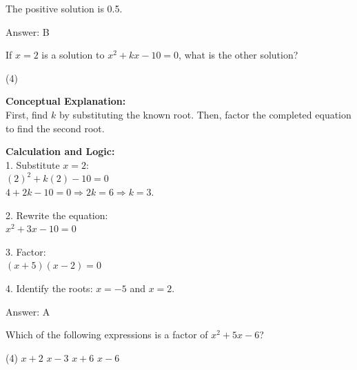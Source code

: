 \documentclass[11pt,paper=a4,answers]{exam}
\begin{document}
\begin{questions}
\begin{solution}
\vspace{10pt}

The positive solution is 0.5.

\vspace{20pt}

Answer: \colorbox{yellow!100}{B}
\end{solution}

\vspace{30pt}

\question
If $x = 2$ is a solution to $x^2 + kx - 10 = 0$, what is the other solution?
\begin{tasks}(4)
\end{tasks}

\begin{solution}
\textbf{Conceptual Explanation:} \\
First, find $k$ by substituting the known root. Then, factor the completed equation to find the second root.

\vspace{15pt}

\textbf{Calculation and Logic:} \\
1. Substitute $x = 2$: \\
   $(2)^2 + k(2) - 10 = 0$ \\
   $4 + 2k - 10 = 0 \Rightarrow 2k = 6 \Rightarrow k = 3$.

\vspace{10pt}

2. Rewrite the equation: \\
   $x^2 + 3x - 10 = 0$

\vspace{10pt}

3. Factor: \\
   $(x + 5)(x - 2) = 0$

\vspace{10pt}

4. Identify the roots: $x = -5$ and $x = 2$.

\vspace{20pt}

Answer: \colorbox{yellow!100}{A}
\end{solution}

\vspace{30pt}

\question
Which of the following expressions is a factor of $x^2 + 5x - 6$?
\begin{tasks}(4)
    \task $x + 2$
    \task $x - 3$
    \task $x + 6$
    \task $x - 6$
\end{tasks}


\end{questions}
\end{document}
